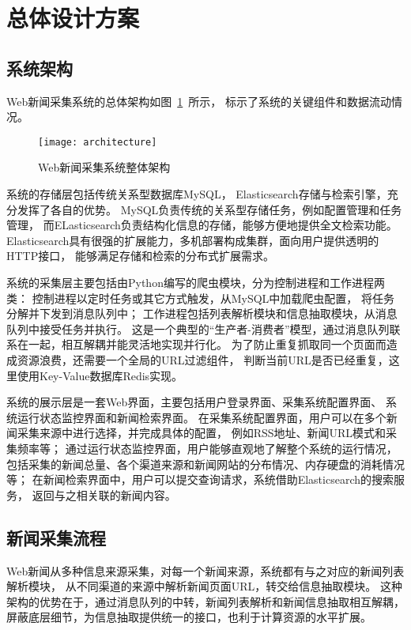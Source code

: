 \section{总体设计方案}
\label{sec:system-architecture}

\subsection{系统架构}
Web新闻采集系统的总体架构如图~\ref{fig:architecture}~所示，
标示了系统的关键组件和数据流动情况。

\begin{figure}[htbp]
\centering
\texttt{[image: architecture]}
\caption{Web新闻采集系统整体架构}
\label{fig:architecture}
\end{figure}

系统的存储层包括传统关系型数据库MySQL，
Elasticsearch存储与检索引擎，充分发挥了各自的优势。
MySQL负责传统的关系型存储任务，例如配置管理和任务管理，
而ELasticsearch负责结构化信息的存储，能够方便地提供全文检索功能。
Elasticsearch具有很强的扩展能力，多机部署构成集群，面向用户提供透明的HTTP接口，
能够满足存储和检索的分布式扩展需求。

系统的采集层主要包括由Python编写的爬虫模块，分为控制进程和工作进程两类：
控制进程以定时任务或其它方式触发，从MySQL中加载爬虫配置，
将任务分解并下发到消息队列中；
工作进程包括列表解析模块和信息抽取模块，从消息队列中接受任务并执行。
这是一个典型的“生产者-消费者”模型，通过消息队列联系在一起，相互解耦并能灵活地实现并行化。
为了防止重复抓取同一个页面而造成资源浪费，还需要一个全局的URL过滤组件，
判断当前URL是否已经重复，这里使用Key-Value数据库Redis实现。

系统的展示层是一套Web界面，主要包括用户登录界面、采集系统配置界面、
系统运行状态监控界面和新闻检索界面。
在采集系统配置界面，用户可以在多个新闻采集来源中进行选择，并完成具体的配置，
例如RSS地址、新闻URL模式和采集频率等；
通过运行状态监控界面，用户能够直观地了解整个系统的运行情况，
包括采集的新闻总量、各个渠道来源和新闻网站的分布情况、内存硬盘的消耗情况等；
在新闻检索界面中，用户可以提交查询请求，系统借助Elasticsearch的搜索服务，
返回与之相关联的新闻内容。

\subsection{新闻采集流程}
Web新闻从多种信息来源采集，对每一个新闻来源，系统都有与之对应的新闻列表解析模块，
从不同渠道的来源中解析新闻页面URL，转交给信息抽取模块。
这种架构的优势在于，通过消息队列的中转，新闻列表解析和新闻信息抽取相互解耦，
屏蔽底层细节，为信息抽取提供统一的接口，也利于计算资源的水平扩展。

